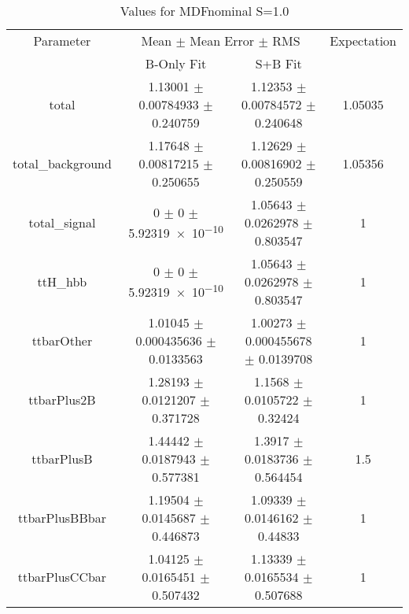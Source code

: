 \begin{table}
\centering
\caption{Values for MDFnominal S=1.0}
\begin{tabular}{cccc}
\toprule
Parameter & \multicolumn{2}{c}{Mean $\pm$ Mean Error $\pm$ RMS} & Expectation\\
 & B-Only Fit & S+B Fit & \\
\midrule
total & \num{1.13001} $\pm$ \num{0.00784933} $\pm$ \num{0.240759} & \num{1.12353} $\pm$ \num{0.00784572} $\pm$ \num{0.240648} & \num{1.05035}\\
total\_background & \num{1.17648} $\pm$ \num{0.00817215} $\pm$ \num{0.250655} & \num{1.12629} $\pm$ \num{0.00816902} $\pm$ \num{0.250559} & \num{1.05356}\\
total\_signal & \num{0} $\pm$ \num{0} $\pm$ \num{5.92319e-10} & \num{1.05643} $\pm$ \num{0.0262978} $\pm$ \num{0.803547} & \num{1}\\
ttH\_hbb & \num{0} $\pm$ \num{0} $\pm$ \num{5.92319e-10} & \num{1.05643} $\pm$ \num{0.0262978} $\pm$ \num{0.803547} & \num{1}\\
ttbarOther & \num{1.01045} $\pm$ \num{0.000435636} $\pm$ \num{0.0133563} & \num{1.00273} $\pm$ \num{0.000455678} $\pm$ \num{0.0139708} & \num{1}\\
ttbarPlus2B & \num{1.28193} $\pm$ \num{0.0121207} $\pm$ \num{0.371728} & \num{1.1568} $\pm$ \num{0.0105722} $\pm$ \num{0.32424} & \num{1}\\
ttbarPlusB & \num{1.44442} $\pm$ \num{0.0187943} $\pm$ \num{0.577381} & \num{1.3917} $\pm$ \num{0.0183736} $\pm$ \num{0.564454} & \num{1.5}\\
ttbarPlusBBbar & \num{1.19504} $\pm$ \num{0.0145687} $\pm$ \num{0.446873} & \num{1.09339} $\pm$ \num{0.0146162} $\pm$ \num{0.44833} & \num{1}\\
ttbarPlusCCbar & \num{1.04125} $\pm$ \num{0.0165451} $\pm$ \num{0.507432} & \num{1.13339} $\pm$ \num{0.0165534} $\pm$ \num{0.507688} & \num{1}\\
\bottomrule
\end{tabular}
\end{table}